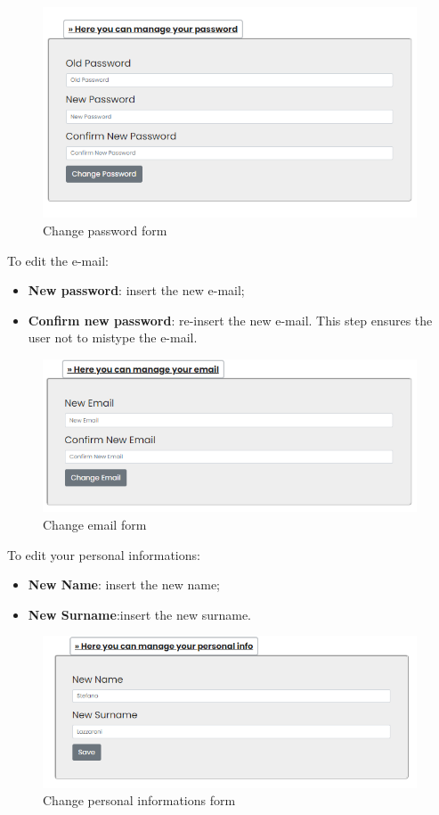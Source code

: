 \begin{figure}[H]
    \centering
    \includegraphics[width=30em]{res/images/cliente/credentialpwd.png}
    \caption{Change password form}
\end{figure}

To edit the e-mail:
\begin{itemize} 
    \item \textbf{New password}: insert the new e-mail; 
    \item \textbf{Confirm new password}: re-insert the new e-mail. This step ensures the user not to  mistype the e-mail.
\end{itemize}

\begin{figure}[H]
    \centering
    \includegraphics[width=30em]{res/images/cliente/credentialemail.png}
    \caption{Change email form}
\end{figure}

To edit your personal informations:
\begin{itemize} 
    \item \textbf{New Name}: insert the new name; 
    \item \textbf{New Surname}:insert the new surname.
\end{itemize}

\begin{figure}[H]
    \centering
    \includegraphics[width=30em]{res/images/cliente/personalinfo.png}
    \caption{Change personal informations form}
\end{figure}

